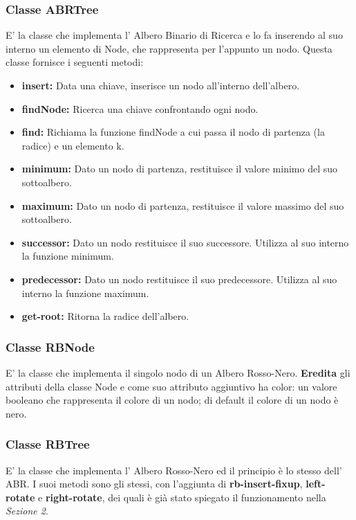 \documentclass{article}
\begin{document}
\subsubsection{Classe ABRTree}
E' la classe che implementa l' Albero Binario di Ricerca e lo fa inserendo al suo interno un elemento di Node, che rappresenta per l'appunto un nodo.
Questa classe fornisce i seguenti metodi:
\begin{itemize}
    \item \textbf{insert:} Data una chiave, inserisce un nodo all'interno dell'albero.
    \item \textbf{findNode:} Ricerca una chiave confrontando ogni nodo.
    \item \textbf{find:} Richiama la funzione findNode a cui passa il nodo di partenza (la radice) e un elemento k.
    \item \textbf{minimum:} Dato un nodo di partenza, restituisce il valore minimo del suo sottoalbero.
    \item \textbf{maximum:} Dato un nodo di partenza, restituisce il valore massimo del suo sottoalbero.
    \item \textbf{successor:} Dato un nodo restituisce il suo successore. Utilizza al suo interno la funzione minimum.
    \item \textbf{predecessor:} Dato un nodo restituisce il suo predecessore. Utilizza al suo interno la funzione maximum.
    \item \textbf{get-root:} Ritorna la radice dell'albero.
\end{itemize}

\subsubsection{Classe RBNode}
E' la classe che implementa il singolo nodo di un Albero Rosso-Nero.
\textbf{Eredita} gli attributi della classe Node e come suo attributo aggiuntivo ha color: un valore booleano che rappresenta il colore di un nodo; di default il colore di un nodo è nero.

\subsubsection{Classe RBTree}
E' la classe che implementa l' Albero Rosso-Nero ed il principio è lo stesso dell' ABR.
I suoi metodi sono gli stessi, con l'aggiunta di \textbf{rb-insert-fixup}, \textbf{left-rotate} e \textbf{right-rotate}, dei quali è già stato spiegato il funzionamento nella \textit{Sezione 2}.
\end{document}
